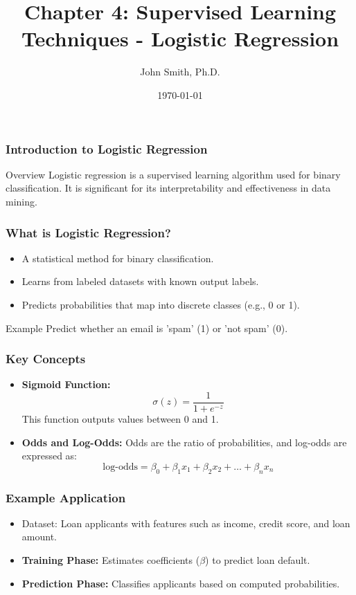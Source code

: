 \documentclass[aspectratio=169]{beamer}
\title[Supervised Learning Techniques]{Chapter 4: Supervised Learning Techniques - Logistic Regression}
\author[J. Smith]{John Smith, Ph.D.}
\institute[University Name]{
  Department of Computer Science\\
  University Name\\
  \vspace{0.3cm}
  Email: email@university.edu\\
  Website: www.university.edu
}
\date{\today}
\begin{document}
\frame{\titlepage}

\begin{frame}[fragile]
    \frametitle{Introduction to Logistic Regression}
    \begin{block}{Overview}
        Logistic regression is a supervised learning algorithm used for binary classification. It is significant for its interpretability and effectiveness in data mining.
    \end{block}
\end{frame}

\begin{frame}[fragile]
    \frametitle{What is Logistic Regression?}
    \begin{itemize}
        \item A statistical method for binary classification.
        \item Learns from labeled datasets with known output labels.
        \item Predicts probabilities that map into discrete classes (e.g., 0 or 1).
    \end{itemize}
    \begin{block}{Example}
        Predict whether an email is 'spam' (1) or 'not spam' (0).
    \end{block}
\end{frame}

\begin{frame}[fragile]
    \frametitle{Key Concepts}
    \begin{itemize}
        \item \textbf{Sigmoid Function:} 
        \begin{equation}
            \sigma(z) = \frac{1}{1 + e^{-z}}
        \end{equation}
        This function outputs values between 0 and 1.
        
        \item \textbf{Odds and Log-Odds:} Odds are the ratio of probabilities, and log-odds are expressed as:
        \begin{equation}
            \text{log-odds} = \beta_0 + \beta_1 x_1 + \beta_2 x_2 + \ldots + \beta_n x_n
        \end{equation}
    \end{itemize}
\end{frame}

\begin{frame}[fragile]
    \frametitle{Example Application}
    \begin{itemize}
        \item Dataset: Loan applicants with features such as income, credit score, and loan amount.
        \item \textbf{Training Phase:} Estimates coefficients (\(\beta\)) to predict loan default.
        \item \textbf{Prediction Phase:} Classifies applicants based on computed probabilities.
    \end{itemize}
\end{frame}
\end{document}
